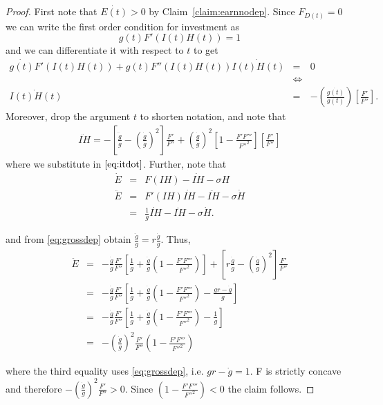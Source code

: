 \begin{proof}
First note that $\dot{E(t)} > 0$ by Claim~\ref{claim:earnnodep}. Since $F_{D(t)} = 0 $ we can write the first order condition for investment as
\begin{equation}
g(t) F'(I(t) H(t)) = 1
\end{equation}
and we can differentiate it with respect to $t$ to get
\begin{eqnarray}
\dot{g(t)} F'(I(t) H(t)) + g(t) F''(I(t) H(t)) \dot{I(t) H(t)} &=& 0 \nonumber \\
&\Leftrightarrow& \nonumber \\
\dot{I(t) H(t)} &=& - \left( \frac{\dot{g(t)}}{g(t)} \right) \left[ \frac{F'}{F''}\right] \label{eq:itdot}.
\end{eqnarray}
\noindent Moreover, drop the argument $t$ to shorten notation, and note that
\begin{eqnarray}
\ddot{IH} = - \left[ \frac{\ddot{g}}{g} - \left( \frac{\dot{g}}{g} \right)^2 \right] \frac{F'}{F''} + \left( \frac{\dot{g}}{g} \right)^2 \left[ 1 - \frac{F'F'''}{{F''}^2} \right] \left[ \frac{F'}{F''} \right]  
\end{eqnarray}  
where we substitute in $\eqref{eq:itdot}$. Further, note that
\begin{eqnarray}
\dot{E} &=& F(IH) - \dot{IH} - \sigma H \nonumber \\
\ddot{E} &=& F'(IH) \dot{IH} - \ddot{IH} - \sigma \dot{H} \nonumber \\
&=& \frac{1}{g} \dot{IH} - \ddot{IH} - \sigma \dot{H}.
\end{eqnarray}

\noindent and from \eqref{eq:grossdep} obtain $\frac{\ddot{g}}{g} = r \frac{\dot{g}}{g}$. Thus,
\begin{eqnarray}
\ddot{E} &=& - \frac{\dot{g}}{g} \frac{F'}{F''} \left[ \frac{1}{g} + \frac{\dot{g}}{g} \left( 1 - \frac{F'F'''}{{F''}^2} \right) \right] + \left[ r \frac{\dot{g}}{g} - \left( \frac{\dot{g}}{g} \right)^2 \right] \frac{F'}{F''} \nonumber \\
&=& - \frac{\dot{g}}{g} \frac{F'}{F''} \left[ \frac{1}{g} + \frac{\dot{g}}{g} \left( 1 - \frac{F'F'''}{{F''}^2} \right) - \frac{gr - \dot{g}}{g} \right] \nonumber \\
&=& - \frac{\dot{g}}{g} \frac{F'}{F''} \left[ \frac{1}{g} + \frac{\dot{g}}{g} \left( 1 - \frac{F'F'''}{{F''}^2} \right) - \frac{1}{g} \right] \nonumber \\
&=& - \left( \frac{\dot{g}}{g} \right)^2 \frac{F'}{F''} \left( 1 - \frac{F'F'''}{{F''}^2} \right)
\end{eqnarray}

\noindent where the third equality uses \eqref{eq:grossdep}, i.e. $gr - \dot{g} = 1$. F is strictly concave and therefore $-\left( \frac{\dot{g}}{g} \right)^2 \frac{F'}{F''} > 0$. Since $\left( 1 - \frac{F'F'''}{{F''}^2} \right) < 0$ the claim follows.
\end{proof}

